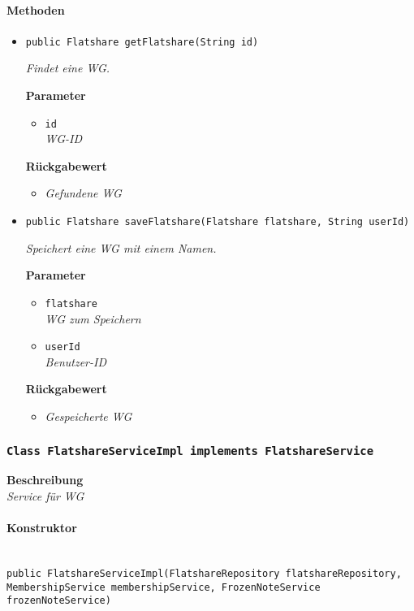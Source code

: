      \paragraph*{Methoden}
     \begin{itemize}
     	\item{\texttt{public Flatshare getFlatshare(String id)}}
     	
     	\textit{Findet eine WG.}
     	
     	\textbf{Parameter}
     	\begin{itemize}
     		\item\texttt{id}\\
     		\textit{WG-ID}
     	\end{itemize}
     	
     	\textbf{Rückgabewert}
     	\begin{itemize}
     		\item\textit{Gefundene WG}
     	\end{itemize}
     
     \item{\texttt{public Flatshare saveFlatshare(Flatshare flatshare, String userId)}}
     	
     	\textit{Speichert eine WG mit einem Namen.}
     	
     	\textbf{Parameter}
     	\begin{itemize}
     		\item\texttt{flatshare}\\
     		\textit{WG zum Speichern}
     		\item\texttt{userId}\\
     		\textit{Benutzer-ID}
     	\end{itemize}
     
     	\textbf{Rückgabewert}
     	\begin{itemize}
     		\item\textit{Gespeicherte WG}
     	\end{itemize}
     \end{itemize}
 
     \subsubsection{\texttt{Class FlatshareServiceImpl implements FlatshareService}}
     \textbf{Beschreibung} \\
     \textit{Service für WG}
     \paragraph*{Konstruktor}\mbox{} \\
     \texttt{public FlatshareServiceImpl(FlatshareRepository flatshareRepository, MembershipService membershipService, FrozenNoteService frozenNoteService)}
